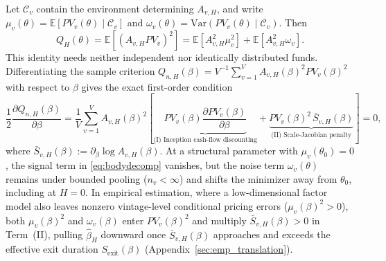 \documentclass[11pt]{article}
\newcommand{\E}{\mathbb{E}}
\newcommand{\Var}{\mathrm{Var}}
\theoremstyle{plain}
\theoremstyle{definition}
\begin{document}
Let $\mathcal C_v$ contain the environment determining $A_{v,H}$, and write
$\mu_v(\theta)=\E[PV_v(\theta)\mid\mathcal C_v]$ and
$\omega_v(\theta)=\Var(PV_v(\theta)\mid\mathcal C_v)$. Then
\begin{equation}
\label{eq:bodydecomp}
Q_H(\theta)=\E[(A_{v,H}PV_v)^2]
=\E[A_{v,H}^2\mu_v^2]+\E[A_{v,H}^2\omega_v].
\end{equation}
This identity needs neither independent nor identically distributed funds. Differentiating the sample criterion $Q_{n,H}(\beta)=V^{-1}\sum_{v=1}^V A_{v,H}(\beta)^2 PV_v(\beta)^2$ with respect to $\beta$ gives the exact first-order condition
\begin{equation}
\label{eq:bodyfoc}
\frac{1}{2}\frac{\partial Q_{n,H}(\beta)}{\partial\beta}
=\frac{1}{V}\sum_{v=1}^V A_{v,H}(\beta)^2\left[
\underbrace{PV_v(\beta)\frac{\partial PV_v(\beta)}{\partial\beta}}_{\text{(I) Inception cash-flow discounting}}
+\underbrace{PV_v(\beta)^2\,\bar S_{v,H}(\beta)}_{\text{(II) Scale-Jacobian penalty}}
\right]=0,
\end{equation}
where $\bar S_{v,H}(\beta):=\partial_\beta\log A_{v,H}(\beta)$. At a structural parameter with $\mu_v(\theta_0)=0$, the signal term in \eqref{eq:bodydecomp} vanishes, but the noise term $\omega_v(\theta)$ remains under bounded pooling ($n_v<\infty$) and shifts the minimizer away from $\theta_0$, including at $H=0$. In empirical estimation, where a low-dimensional factor model also leaves nonzero vintage-level conditional pricing errors ($\mu_v(\beta)^2>0$), both $\mu_v(\beta)^2$ and $\omega_v(\beta)$ enter $PV_v(\beta)^2$ and multiply $\bar S_{v,H}(\beta)>0$ in Term~(II), pulling $\hat\beta_H$ downward once $\bar S_{v,H}(\beta)$ approaches and exceeds the effective exit duration $S_{\mathrm{exit}}(\beta)$ (Appendix~\ref{sec:emp_translation}).
\end{document}
